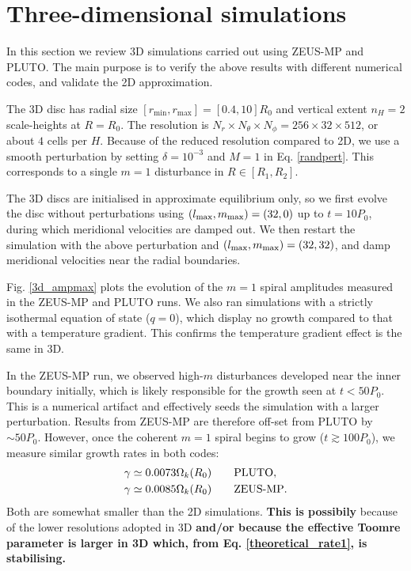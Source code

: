 \section{Three-dimensional simulations}\label{results3d}
In this section we review 3D simulations carried 
out using ZEUS-MP and PLUTO. The main purpose is to verify 
the above results with different numerical codes, and validate  
the 2D approximation.    

The 3D disc has radial size
$[r_\mathrm{min},r_\mathrm{max}]=[0.4,10]R_0$ and vertical extent  
$n_H=2$ scale-heights at $R=R_0$. The resolution is $N_r\times N_\theta\times
N_\phi=256\times32\times512$, or about $4$ cells per
$H$. Because of the reduced resolution 
compared to 2D, we use a smooth perturbation by setting
$\delta = 10^{-3}$ and $M=1$ in Eq. \ref{randpert}. This corresponds
to a single $m=1$ disturbance in $R\in[R_1,R_2]$.

The 3D discs are initialised in approximate equilibrium only, so we
first evolve the disc without perturbations using  
$(l_\mathrm{max},m_\mathrm{max})=(32,0)$ up to $t=10P_0$, during which 
meridional velocities are damped out. We then restart the simulation
with the above perturbation and $(l_\mathrm{max},m_\mathrm{max})=(32,32)$, and damp
meridional velocities near the radial boundaries. 

Fig. \ref{3d_ampmax} plots the evolution of the $m=1$ spiral amplitudes measured
in the ZEUS-MP and PLUTO runs. We also ran simulations
with a strictly isothermal equation of state ($q=0$), which display no
growth compared to that with a temperature gradient.  This confirms
the temperature gradient effect is the same in 3D. 

In the ZEUS-MP run, we observed high-$m$ disturbances developed near 
the inner boundary initially, which is likely responsible for the
growth seen at $t<50P_0$. This is a numerical artifact and effectively
seeds the simulation with a larger perturbation. Results
from ZEUS-MP are therefore off-set from PLUTO by $\sim50P_0$. However,
once the coherent $m=1$ spiral begins to grow ($t\gtrsim 100P_0$), 
we measure similar growth rates in both codes: 
\begin{align*}
  &\gamma \simeq 0.0073\Omega_k(R_0) \quad\quad \mathrm{PLUTO},\\
  &\gamma \simeq 0.0085\Omega_k(R_0) \quad\quad {\operatorname{ZEUS-MP}}.
\end{align*}
Both are somewhat smaller than the 2D simulations. {\bf This is
  possibily} because of the lower resolutions adopted in 3D {\bf
  and/or because the effective Toomre parameter is larger in 3D which,
  from Eq. \ref{theoretical_rate1}, is stabilising.} 

